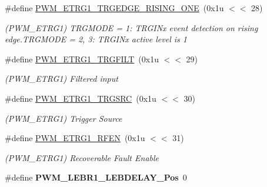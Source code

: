 \begin{DoxyCompactItemize}
\mbox{\label{group__SAMS70__PWM_ga6b672d5ab66c44eda17f0224b2117447}} 
\#define \mbox{\hyperlink{group__SAMS70__PWM_ga6b672d5ab66c44eda17f0224b2117447}{P\+W\+M\+\_\+\+E\+T\+R\+G1\+\_\+\+T\+R\+G\+E\+D\+G\+E\+\_\+\+R\+I\+S\+I\+N\+G\+\_\+\+O\+NE}}~(0x1u $<$$<$ 28)
\begin{DoxyCompactList}\small\item\em (P\+W\+M\+\_\+\+E\+T\+R\+G1) T\+R\+G\+M\+O\+DE = 1\+: T\+R\+G\+I\+Nx event detection on rising edge.\+T\+R\+G\+M\+O\+DE = 2, 3\+: T\+R\+G\+I\+Nx active level is 1 \end{DoxyCompactList}\item 
\mbox{\label{group__SAMS70__PWM_ga31025a4e43c73075e8035dace5874ffa}} 
\#define \mbox{\hyperlink{group__SAMS70__PWM_ga31025a4e43c73075e8035dace5874ffa}{P\+W\+M\+\_\+\+E\+T\+R\+G1\+\_\+\+T\+R\+G\+F\+I\+LT}}~(0x1u $<$$<$ 29)
\begin{DoxyCompactList}\small\item\em (P\+W\+M\+\_\+\+E\+T\+R\+G1) Filtered input \end{DoxyCompactList}\item 
\mbox{\label{group__SAMS70__PWM_ga616ec21bb9207fdb750346ff7c510f20}} 
\#define \mbox{\hyperlink{group__SAMS70__PWM_ga616ec21bb9207fdb750346ff7c510f20}{P\+W\+M\+\_\+\+E\+T\+R\+G1\+\_\+\+T\+R\+G\+S\+RC}}~(0x1u $<$$<$ 30)
\begin{DoxyCompactList}\small\item\em (P\+W\+M\+\_\+\+E\+T\+R\+G1) Trigger Source \end{DoxyCompactList}\item 
\mbox{\label{group__SAMS70__PWM_gaf62f0bc7d9db8450ab1c1ecde517d9a2}} 
\#define \mbox{\hyperlink{group__SAMS70__PWM_gaf62f0bc7d9db8450ab1c1ecde517d9a2}{P\+W\+M\+\_\+\+E\+T\+R\+G1\+\_\+\+R\+F\+EN}}~(0x1u $<$$<$ 31)
\begin{DoxyCompactList}\small\item\em (P\+W\+M\+\_\+\+E\+T\+R\+G1) Recoverable Fault Enable \end{DoxyCompactList}\item 
\mbox{\label{group__SAMS70__PWM_ga5973634d62b8e525c44969baf1841f96}} 
\#define {\bfseries P\+W\+M\+\_\+\+L\+E\+B\+R1\+\_\+\+L\+E\+B\+D\+E\+L\+A\+Y\+\_\+\+Pos}~0

\end{DoxyCompactItemize}
